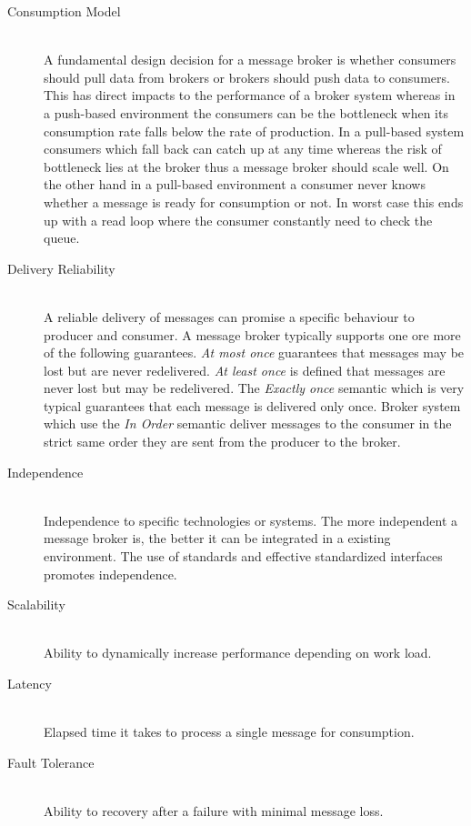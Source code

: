 \begin{description}
 \item [Consumption Model] \hfill \\
    { A fundamental design decision for a message broker is whether consumers
    should pull data from brokers or brokers should push data to consumers. This
has direct impacts to the performance of a broker system whereas in a push-based
environment the consumers can be the bottleneck when its consumption rate falls
below the rate of production. In a pull-based system consumers which fall back
can catch up at any time whereas the risk of bottleneck lies at the broker thus
 a message broker should scale well. On the other hand in a pull-based
 environment a consumer never knows whether a message is ready for consumption
 or not. In worst case this ends up with a read loop where the consumer
 constantly need to check the queue. \cite{apachekafka} }
    \item [Delivery Reliability] \hfill \\
    {
    A reliable delivery of messages can promise a specific behaviour to producer
    and consumer. A message broker typically supports one ore more of the
    following guarantees.
    \textit{At most once} guarantees that messages may be lost but are never
    redelivered. \textit{At least once} is defined that messages are never lost
    but may be redelivered. The \textit{Exactly once} semantic which is very
    typical guarantees that each message is delivered only once. Broker system
    which use the \textit{In Order} semantic deliver messages to the consumer in
    the strict same order they are sent from the producer to the broker. 
    }
    \item [Independence] \hfill \\
    { Independence to specific technologies or systems. The more independent a
        message broker is, the better it can be integrated in a existing
        environment. The use of standards and effective standardized interfaces
        promotes independence.}
    \item [Scalability] \hfill \\
    {Ability to dynamically increase performance depending on work load.  }
    \item [Latency]\hfill \\
    {Elapsed time it takes to process a single message for consumption.  }
\item [Fault Tolerance] \hfill \\
        {Ability to recovery after a failure with minimal message loss.
}
\end{description}
